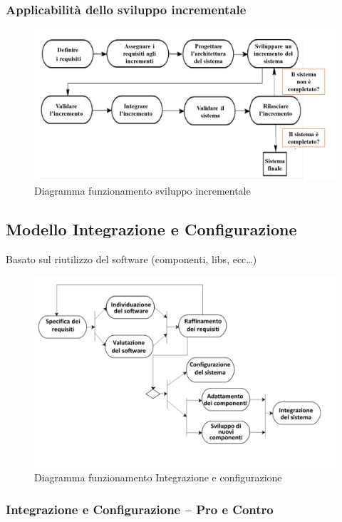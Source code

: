 \documentclass{article}
\begin{document}
	\subsubsection{Applicabilità dello sviluppo incrementale}
	\begin{figure}[h]
		\centering
		\includegraphics[scale=0.3]{8.diag_svil_inc.png}
		\caption{Diagramma funzionamento sviluppo incrementale}
		\label{fig:im-8}
	\end{figure}
	\subsection{Modello Integrazione e Configurazione}
	Basato sul riutilizzo del software (componenti, libs, ecc…)
	\begin{figure}[h]
		\centering
		\includegraphics[scale=0.3]{9.diag_int_conf.png}
		\caption{Diagramma funzionamento Integrazione e configurazione}
		\label{fig:im-9}
	\end{figure}
	\subsubsection{Integrazione e Configurazione – Pro e Contro}
\end{document}
